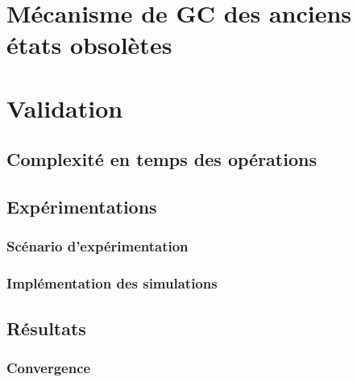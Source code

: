 % 

\section{Mécanisme de \acl{GC} des anciens états obsolètes}


\section{Validation}
\label{sec:evaluation}

\subsection{Complexité en temps des opérations}


\subsection{Expérimentations}


\subsubsection{Scénario d'expérimentation}


\subsubsection{Implémentation des simulations}


\subsection{Résultats}


\subsubsection{Convergence}


